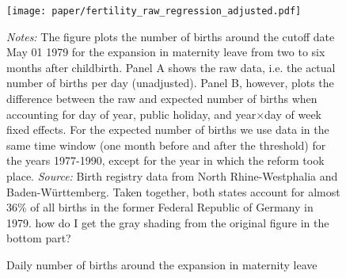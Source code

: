 \documentclass[11pt, a4paper]{article} %
\begin{document}
	\vspace*{\fill}
\begin{figure}[H]\centering
	\caption{Daily number of births around the expansion in maternity leave}\label{fig: fertilitydistr}
	\texttt{[image: paper/fertility\_raw\_regression\_adjusted.pdf]}
	\scriptsize
	\begin{minipage}{0.9 \linewidth}
		\emph{Notes:} The figure plots the number of births around the cutoff date May 01 1979 for the expansion in maternity leave from two to six months after childbirth. Panel A shows the raw data, i.e. the actual number of births per day (unadjusted). Panel B, however, plots the difference between the raw and expected number of births when accounting for day of year, public holiday, and year$\times$day of week fixed effects. For the expected number of births we use data in the same time window (one month before and after the threshold) for the years 1977-1990, except for the year in which the reform took place. \newline\emph{Source:} Birth registry data from North Rhine-Westphalia and Baden-Württemberg. Taken together, both states account for almost 36\% of all births in the former Federal Republic of Germany in 1979.
		{\color{red}how do I get the gray shading from the original figure in the bottom part?}
	\end{minipage}
\end{figure}
\vspace*{\fill}\clearpage

\end{document}
